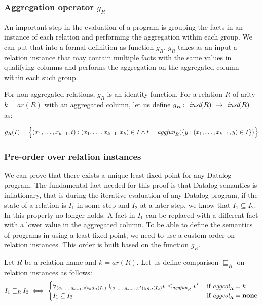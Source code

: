 \subsubsection{Aggregation operator $g_R$}
An important step in the evaluation of a \datalogra program is grouping the facts in an instance of each relation and performing the aggregation within each group. We can put that into a formal definition as function $g_R$. $g_R$ takes as an input a relation instance that may contain multiple facts with the same values in  qualifying columns and performs the aggregation on the aggregated column within each such group.
\begin{defn}\label{d:aggregationoperationgr}
For non-aggregated relations, $g_R$ is an identity function. For a relation $R$ of arity $k = ar(R)$ with an aggregated column, let us define $g_R:~\textit{inst}(R)~\to~\textit{inst}(R)$ as:  

$$g_R(I) = 
       \Big\{(x_1, \dots, x_{k-1}, t): (x_1, \dots, x_{k-1}, x_k) \in I \wedge t = \textit{aggfun}_R(\{y: (x_1, \dots, x_{k-1}, y) \in I\})\Big\}
$$
\end{defn}

\subsubsection{Pre-order over relation instances}
We can prove that there exists a unique least fixed point for any Datalog program. The fundamental fact needed for this proof is that Datalog semantics is inflationary, that is during the iterative evaluation of any Datalog program, if the state of a relation is $I_1$ in some step and $I_2$ at a later step, we know that $I_1 \subseteq I_2$. In \datalogra this property no longer holds. A fact in $I_1$ can be replaced with a different fact with a lower value in the aggregated column. To be able to define the semantics of programs in \datalogra using a least fixed point, we need to use a custom order on relation instances. This order is built based on the function $g_R$.

\begin{defn}
Let $R$ be a relation name and $k=ar(R)$. Let us define comparison $\sqsubseteq_R$ on relation instances as follows:
$$
I_1 \sqsubseteq_R I_2 \iff
\begin{cases}
   \forall_{(q_1, ..., q_{k-1}, v) \in g_R(I_1)} \exists_{(q_1, ..., q_{k-1}, v') \in g_R(I_2)} v \le_{\textit{aggfun}_R} v' & \text{ if } \textit{aggcol}_R = k \\
   I_1 \subseteq I_2 & \text{ if } \textit{aggcol}_R = \bf{none} 
\end{cases}
$$
\end{defn}

